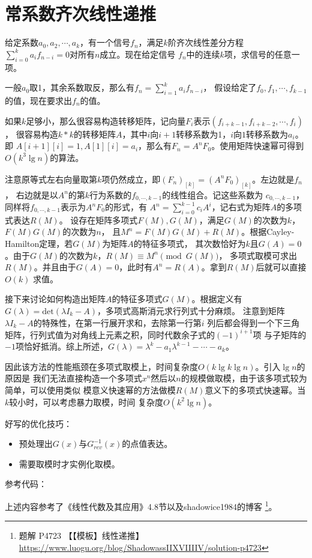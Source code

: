 \section{常系数齐次线性递推}
给定系数$a_0,a_2,\cdots,a_k$，有一个信号${f_n}$，满足$k$阶齐次线性差分方程
$\displaystyle \sum_{i=0}^k{a_if_{n-i}}=0$对所有$n$成立。现在给定信号
${f_n}$中的连续$k$项，求信号的任意一项。

一般$a_0$取1，其余系数取反，那么有$\displaystyle f_n=\sum_{i=1}^k{a_if_{n-i}}$，
假设给定了$f_0,f_1,\cdots,f_{k-1}$的值，现在要求出$f_n$的值。

如果$k$足够小，那么很容易构造转移矩阵，记向量$F_i$表示$(f_{i+k-1},f_{i+k-2},\cdots,f_i)$，
很容易构造$k*k$的转移矩阵$A$，其中$i$向$i+1$转移系数为1，$i$向$1$转移系数为$a_i$。即
$A[i+1][i]=1,A[1][i]=a_i$，那么有$F_n=A^nF_0$。使用矩阵快速幂可得到
$O(k^3\lg n)$的算法。

注意原等式左右向量取第$k$项仍然成立，即$(F_n)_{[k]}=(A^nF_0)_{[k]}$。左边就是$f_n$，
右边就是以$A^n$的第$k$行为系数的$f_{0,\cdots,k-1}$的线性组合。记这些系数为
$c_{0,\cdots,k-1}$，同样将$f_{0,\cdots,k-1}$表示为$A^nF_0$的形式，有
$A^n=\displaystyle \sum_{i=0}^{k-1}{c_iA^i}$，记右式为矩阵$A$的多项式表达$R(M)$。
设存在矩阵多项式$F(M),G(M)$，满足$G(M)$的次数为$k$，$F(M)G(M)$的次数为$n$，
且$M^n=F(M)G(M)+R(M)$。根据Cayley-Hamilton定理，若$G(M)$为矩阵$A$的特征多项式，
其次数恰好为$k$且$G(A)=0$。由于$G(M)$的次数为$k$，$R(M)\equiv M^n\pmod{G(M)}$，
多项式取模可求出$R(M)$。并且由于$G(A)=0$，此时有$A^n=R(A)$。拿到$R(M)$后就可以直接$O(k)$
求值。

接下来讨论如何构造出矩阵$A$的特征多项式$G(M)$。根据定义有
$G(\lambda)=\textrm{det}(\lambda I_k-A)$，多项式高斯消元求行列式十分麻烦。
注意到矩阵$\lambda I_k-A$的特殊性，在第一行展开求和，去除第一行第$i$
列后都会得到一个下三角矩阵，行列式值为对角线上元素之积，同时代数余子式的$(-1)^{i+1}$项
与子矩阵的$-1$项恰好抵消。综上所述，$G(\lambda)=\lambda^k-a_1\lambda^{k-1}-\cdots-a_k$。

因此该方法的性能瓶颈在多项式取模上，时间复杂度$O(k\lg k\lg n)$。引入$\lg n$的原因是
我们无法直接构造一个多项式$x^n$然后以$n$的规模做取模，由于该多项式较为简单，可以使用类似
模意义快速幂的方法做模$R(M)$意义下的多项式快速幂。当$k$较小时，可以考虑暴力取模，时间
复杂度$O(k^2\lg n)$。

好写的优化技巧：
\begin{itemize}
    \item 预处理出$G(x)$与$G_{rev}^{-1}(x)$的点值表达。
    \item 需要取模时才实例化取模。
\end{itemize}

参考代码：


上述内容参考了《线性代数及其应用》\cite{LAIA5}4.8节以及shadowice1984的博客
\footnote{
    题解 P4723 【【模板】线性递推】
    \url{https://www.luogu.org/blog/ShadowassIIXVIIIIV/solution-p4723}
}。
